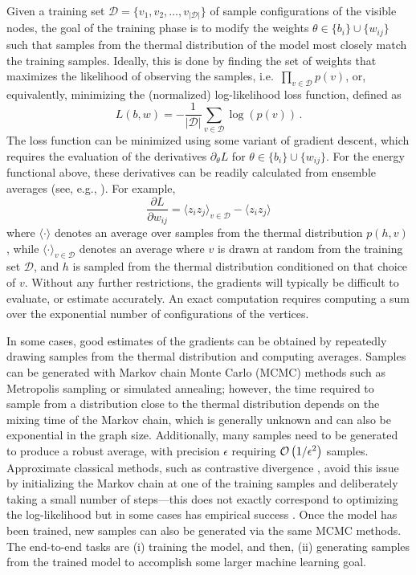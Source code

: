 \begin{refsection}
Given a training set $\mathcal{D} = \{v_1,v_2,\ldots,v_{\lvert \mathcal{D} \rvert}\}$ of sample configurations of the visible nodes, the goal of the training phase is to modify the weights $\theta \in \{b_i\} \cup \{w_{ij}\}$ 
 such that samples from the thermal distribution of the model most closely match the training samples. Ideally, this is done by finding the set of weights that maximizes the likelihood of observing the samples, i.e.~$\prod_{v\in \mathcal{D}} p(v)$, or, equivalently, minimizing the (normalized) log-likelihood loss function, defined as
\begin{equation} L(b,w)=-\frac{1}{\lvert \mathcal{D} \rvert }\sum_{v\in\mathcal{D}} \log(p(v)) \,.
\end{equation} 
The loss function can be minimized using some variant of gradient descent, which requires the evaluation of the derivatives $\partial_{\theta}L$ for $\theta \in \{b_i\} \cup \{w_{ij}\}$. For the energy functional above, these derivatives can be readily calculated from ensemble averages (see, e.g., \cite{wiebe2014quantum}). For example, 
\begin{equation}\label{eq:EBM_gradient}
    \frac{\partial L}{\partial w_{ij}} = \langle z_iz_j \rangle_{v \in \mathcal{D}} - \langle z_iz_j \rangle
\end{equation}
where $\langle \cdot \rangle$ denotes an average over samples from the thermal distribution $p(h,v)$, while $\langle \cdot \rangle_{v \in \mathcal{D}}$ denotes an average where $v$ is drawn at random from the training set $\mathcal{D}$, and $h$ is sampled from the thermal distribution conditioned on that choice of $v$. 
Without any further restrictions, the gradients will typically be difficult to evaluate, or estimate accurately. An exact computation requires computing a sum over the exponential number of configurations of the vertices. 


In some cases, good estimates of the gradients can be obtained by repeatedly drawing samples from the thermal distribution and computing averages. Samples can be generated with Markov chain Monte Carlo (MCMC) methods such as Metropolis sampling or simulated annealing; however, the time required to sample from a distribution close to the thermal distribution depends on the mixing time of the Markov chain, which is generally unknown and can also be exponential in the graph size. Additionally, many samples need to be generated to produce a robust average, with precision $\epsilon$ requiring $\mathcal{O}\left( 1/\epsilon^2 \right)$ samples. Approximate classical methods, such as contrastive divergence \cite{hinton2002contrastiveDivergence}, avoid this issue by initializing the Markov chain at one of the training samples and deliberately taking a small number of steps---this does not exactly correspond to optimizing the log-likelihood but in some cases has empirical success \cite{schuld2021machineLearning}.  
Once the model has been trained, new samples can also be generated via the same MCMC methods. The end-to-end tasks are (i) training the model, and then, (ii)  generating samples from the trained model to accomplish some larger machine learning goal.


\end{refsection}
